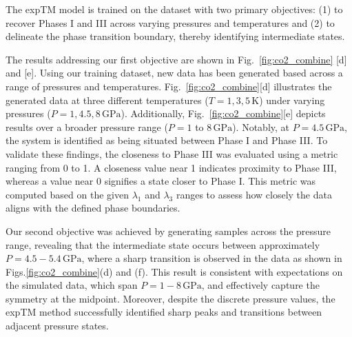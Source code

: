 \documentclass[aip,jcp,reprint,longbibliography]{revtex4-1}
\newcommand{\slee}[1]{{\color{blue}{#1}}}
\begin{document}
The expTM model is trained on the dataset with two primary objectives:  (1) to recover Phases I and III across varying pressures and temperatures and (2) to delineate the phase transition boundary, thereby identifying intermediate states. 

The results addressing our first objective are shown in Fig.~\ref{fig:co2_combine} [d] and [e]. Using our training dataset, new data has been generated based across a range of pressures and temperatures. Fig.~\ref{fig:co2_combine}[d] illustrates the generated data at three different temperatures ($T = 1, 3, 5\, \mathrm{K}$) under varying pressures ($P = 1, 4.5, 8\, \mathrm{GPa}$). Additionally, Fig.~\ref{fig:co2_combine}[e] depicts results over a broader pressure range ($P = 1$ to $8\, \mathrm{GPa}$). Notably, at $P = 4.5\, \mathrm{GPa}$, the system is identified as being situated between Phase I and Phase III.  To validate these findings, the closeness to Phase III was evaluated using a metric ranging from 0 to 1. A closeness value near 1 indicates proximity to Phase III, whereas a value near 0 signifies a state closer to Phase I. This metric was computed based on the given $\lambda_1$ and $\lambda_3$ ranges to assess how closely the data aligns with the defined phase boundaries. 

Our second objective was achieved by generating samples across the pressure range, revealing that the intermediate state occurs between approximately $P = 4.5 - 5.4\, \mathrm{GPa}$, where a sharp transition is observed in the data as shown in Figs.\ref{fig:co2_combine}(d) and (f). This result is consistent with expectations on the simulated data, which span
$P = 1 - 8\, \mathrm{GPa}$, and effectively capture the symmetry at the midpoint. Moreover, despite the discrete pressure values, the expTM method successfully identified sharp peaks and transitions between adjacent pressure states.
\slee{Not only limited to the given applications, more broadly, we believe that the isothermal-isobaric ensemble is particularly well-suited to a CV-based expTM framework, especially for pressure-driven systems. The successful application of CO$_2$ crystal polymorphism demonstrates that the expTM model applies to systems with well-defined phase boundaries across different thermodynamic conditions.}
\end{document}
